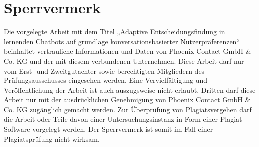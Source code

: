 \section*{Sperrvermerk}

Die vorgelegte Arbeit mit dem Titel „Adaptive Entscheidungsfindung in lernenden Chatbots auf grundlage konversationsbasierter Nutzerpräferenzen“ beinhaltet vertrauliche Informationen und Daten von Phoenix Contact GmbH \& Co. KG und der mit diesem verbundenen Unternehmen. Diese Arbeit darf nur vom Erst- und Zweitgutachter sowie berechtigten Mitgliedern des Prüfungsausschusses eingesehen werden. Eine Vervielfältigung und Veröffentlichung der Arbeit ist auch auszugsweise nicht erlaubt. Dritten darf diese Arbeit nur mit der ausdrücklichen Genehmigung von Phoenix Contact GmbH \& Co. KG zugänglich gemacht werden. Zur Überprüfung von Plagiatsvergehen darf die Arbeit oder Teile davon einer Untersuchungsinstanz in Form einer Plagiat-Software vorgelegt werden. Der Sperrvermerk ist somit im Fall einer Plagiatsprüfung nicht wirksam.

\newpage
\fancyhead[R]{\leftmark}